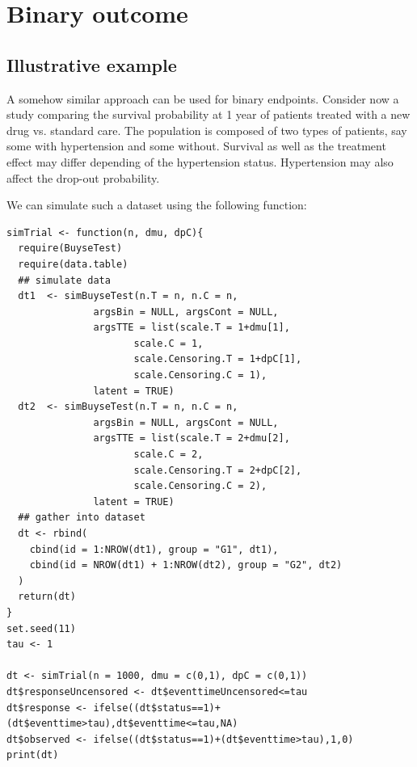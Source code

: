 \documentclass[12pt]{article}
\begin{document}
\bigskip

\section{Binary outcome}
\label{sec:org3187273}

\subsection{Illustrative example}
\label{sec:org90844f8}
A somehow similar approach can be used for binary endpoints. Consider
now a study comparing the survival probability at 1 year of patients
treated with a new drug vs. standard care. The population is composed
of two types of patients, say some with hypertension and some
without. Survival as well as the treatment effect may differ depending
of the hypertension status. Hypertension may also affect the drop-out
probability.

\clearpage

We can simulate such a dataset using the following function:
\lstset{language=r,label= ,caption= ,captionpos=b,numbers=none}
\begin{lstlisting}
simTrial <- function(n, dmu, dpC){
  require(BuyseTest)
  require(data.table)
  ## simulate data
  dt1  <- simBuyseTest(n.T = n, n.C = n, 
		       argsBin = NULL, argsCont = NULL, 
		       argsTTE = list(scale.T = 1+dmu[1],
				      scale.C = 1,
				      scale.Censoring.T = 1+dpC[1],
				      scale.Censoring.C = 1),
		       latent = TRUE)
  dt2  <- simBuyseTest(n.T = n, n.C = n, 
		       argsBin = NULL, argsCont = NULL, 
		       argsTTE = list(scale.T = 2+dmu[2],
				      scale.C = 2,
				      scale.Censoring.T = 2+dpC[2],
				      scale.Censoring.C = 2),
		       latent = TRUE)
  ## gather into dataset
  dt <- rbind(
    cbind(id = 1:NROW(dt1), group = "G1", dt1),
    cbind(id = NROW(dt1) + 1:NROW(dt2), group = "G2", dt2)
  )
  return(dt)
}
set.seed(11)
tau <- 1

dt <- simTrial(n = 1000, dmu = c(0,1), dpC = c(0,1))
dt$responseUncensored <- dt$eventtimeUncensored<=tau
dt$response <- ifelse((dt$status==1)+(dt$eventtime>tau),dt$eventtime<=tau,NA)
dt$observed <- ifelse((dt$status==1)+(dt$eventtime>tau),1,0)
print(dt)
\end{lstlisting}
\end{document}
